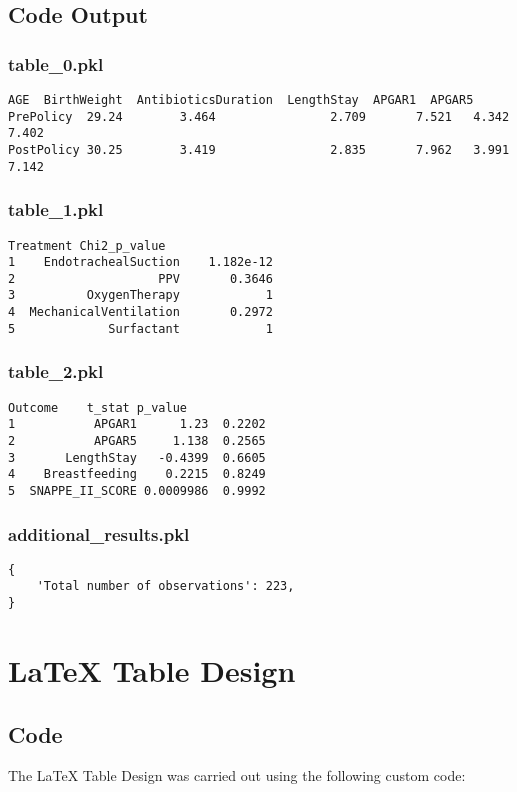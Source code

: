 \documentclass[11pt]{article}
\begin{document}
\subsection{Code Output}

\subsubsection*{table\_0.pkl}

\begin{Verbatim}[tabsize=4]
             AGE  BirthWeight  AntibioticsDuration  LengthStay  APGAR1  APGAR5
PrePolicy  29.24        3.464                2.709       7.521   4.342   7.402
PostPolicy 30.25        3.419                2.835       7.962   3.991   7.142
\end{Verbatim}

\subsubsection*{table\_1.pkl}

\begin{Verbatim}[tabsize=4]
               Treatment Chi2_p_value
1    EndotrachealSuction    1.182e-12
2                    PPV       0.3646
3          OxygenTherapy            1
4  MechanicalVentilation       0.2972
5             Surfactant            1
\end{Verbatim}

\subsubsection*{table\_2.pkl}

\begin{Verbatim}[tabsize=4]
           Outcome    t_stat p_value
1           APGAR1      1.23  0.2202
2           APGAR5     1.138  0.2565
3       LengthStay   -0.4399  0.6605
4    Breastfeeding    0.2215  0.8249
5  SNAPPE_II_SCORE 0.0009986  0.9992
\end{Verbatim}

\subsubsection*{additional\_results.pkl}

\begin{Verbatim}[tabsize=4]
{
    'Total number of observations': 223,
}
\end{Verbatim}

\section{LaTeX Table Design} \subsection{Code}The LaTeX Table Design was carried out using the following custom code:
\end{document}
